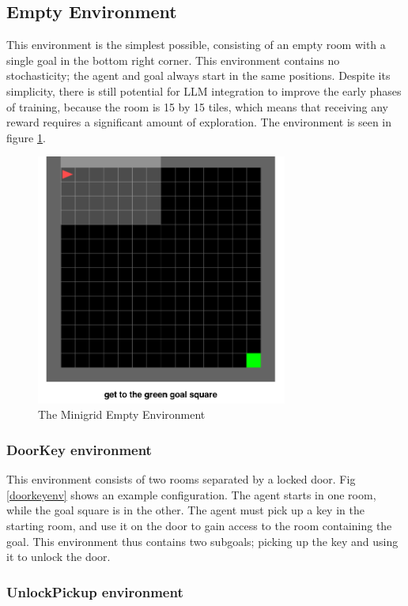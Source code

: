 \documentclass[conference]{IEEEtran}
\begin{document}
\subsection{Empty Environment}

This environment is the simplest possible, consisting of an empty room with a single goal in the bottom right corner. This environment contains no stochasticity; the agent and goal always start in the same positions. Despite its simplicity, there is still potential for LLM integration to improve the early phases of training, because the room is 15 by 15 tiles, which means that receiving any reward requires a significant amount of exploration. The environment is seen in figure \ref{emptyenv}.

\begin{figure}[h]
\centerline{\includegraphics[width=3.25in]{figure/emptyenv.png}}
\caption{The Minigrid Empty Environment}
\label{emptyenv}
\end{figure}

\subsubsection{DoorKey environment}

This environment consists of two rooms separated by a locked door. Fig \ref{doorkeyenv} shows an example configuration. The agent starts in one room, while the goal square is in the other. The agent must pick up a key in the starting room, and use it on the door to gain access to the room containing the goal. This environment thus contains two subgoals; picking up the key and using it to unlock the door.

\subsubsection{UnlockPickup environment}
\end{document}
